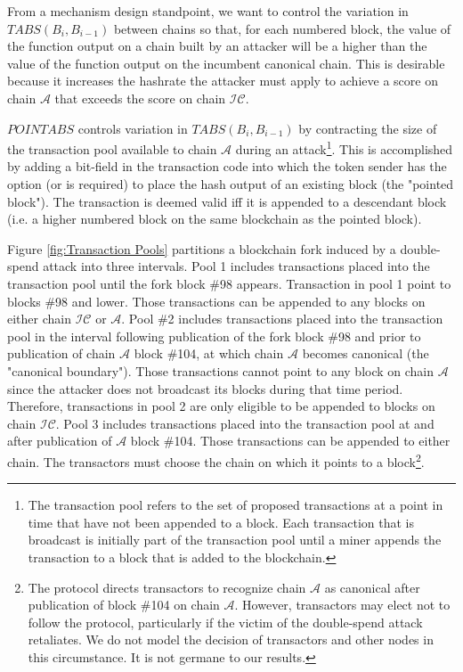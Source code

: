 \documentclass[11pt]{article}
\theoremstyle{plain}
\begin{document}
From a mechanism design standpoint, we want to control the variation in $TABS(B_{i}, B_{i-1})$ between chains so that, for each numbered block, the value of the function output on a chain built by an attacker will be a higher than the value of the function output on the incumbent canonical chain. This is desirable because it increases the hashrate the attacker must apply to achieve a score on chain $\mathcal{A}$ that exceeds the score on chain $\mathcal{IC}$. 

$POINTABS$ controls variation in $TABS(B_{i}, B_{i-1})$ by contracting the size of the transaction pool available to chain $\mathcal{A}$ during an attack\footnote{The transaction pool refers to the set of proposed transactions at a point in time that have not been appended to a block. Each transaction that is broadcast is initially part of the transaction pool until a miner appends the transaction to a block that is added to the blockchain.}. This is accomplished by adding a bit-field in the transaction code into which the token sender has the option (or is required) to place the hash output of an existing block (the "pointed block"). The transaction is deemed valid iff it is appended to a descendant block (i.e. a higher numbered block on the same blockchain as the pointed block). 

Figure \ref{fig:Transaction Pools} partitions a blockchain fork induced by a double-spend attack into three intervals. Pool 1 includes transactions placed into the transaction pool until the fork block \#98 appears. Transaction in pool 1 point to blocks \#98 and lower. Those transactions can be appended to any blocks on either chain $\mathcal{IC}$ or $\mathcal{A}$. Pool \#2 includes transactions placed into the transaction pool in the interval following publication of the fork block \#98 and prior to publication of chain $\mathcal{A}$ block \#104, at which chain $\mathcal{A}$ becomes canonical (the "canonical boundary"). Those transactions cannot point to any block on chain $\mathcal{A}$ since the attacker does not broadcast its blocks during that time period. Therefore, transactions in pool 2 are only eligible to be appended to blocks on chain $\mathcal{IC}$. Pool 3 includes transactions placed into the transaction pool at and after publication of $\mathcal{A}$ block \#104. Those transactions can be appended to either chain. The transactors must choose the chain on which it points to a block\footnote{ The protocol directs transactors to recognize chain $\mathcal{A}$ as canonical after publication of block \#104 on chain $\mathcal{A}$. However, transactors may elect not to follow the protocol, particularly if the victim of the double-spend attack retaliates. We do not model the decision of transactors and other nodes in this circumstance. It is not germane to our results.}.
\end{document}
